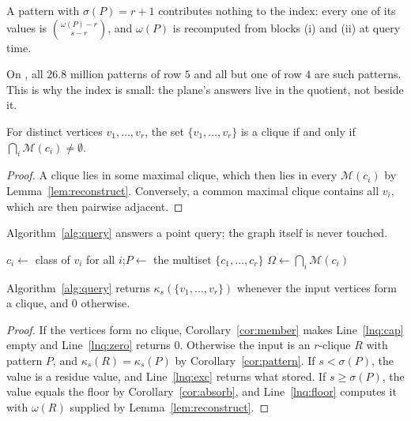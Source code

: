 \begin{corollary}\label{cor:zerobyte}
A pattern with $\sigma(P)=r+1$ contributes nothing to the index: every one of its values is $\binom{\omega(P)-r}{s-r}$, and $\omega(P)$ is recomputed from blocks (i) and (ii) at query time.
\end{corollary}

On \pkustk, all $26.8$ million patterns of row $5$ and all but one of row $4$ are such patterns.
%
This is why the index is small: the plane's answers live in the quotient, not beside it.

\begin{corollary}\label{cor:member}
For distinct vertices $v_1,\dots,v_r$, the set $\{v_1,\dots,v_r\}$ is a clique if and only if $\bigcap_i\mathcal{M}(c_i)\neq\emptyset$.
\end{corollary}

\begin{proof}
A clique lies in some maximal clique, which then lies in every $\mathcal{M}(c_i)$ by Lemma~\ref{lem:reconstruct}.
%
Conversely, a common maximal clique contains all $v_i$, which are then pairwise adjacent.
\end{proof}

Algorithm~\ref{alg:query} answers a point query; the graph itself is never touched.

\begin{algorithm}[t]
\caption{\queryalg: answer $\kappa_s$ for given vertices.}
\label{alg:query}
\algfontsize
{}
$c_i \leftarrow$ class of $v_i$ for all $i$;\quad $P \leftarrow$ the multiset $\{c_1,\dots,c_r\}$\label{lnq:cls}\;
$\Omega \leftarrow \bigcap_{i}\mathcal{M}(c_i)$\label{lnq:cap}\;
\label{lnq:floor}\;
\end{algorithm}

\begin{theorem}\label{thm:query}
Algorithm~\ref{alg:query} returns $\kappa_s(\{v_1,\dots,v_r\})$ whenever the input vertices form a clique, and $0$ otherwise.
\end{theorem}

\begin{proof}
If the vertices form no clique, Corollary~\ref{cor:member} makes Line~\ref{lnq:cap} empty and Line~\ref{lnq:zero} returns $0$.
%
Otherwise the input is an $r$-clique $R$ with pattern $P$, and $\kappa_s(R)=\kappa_s(P)$ by Corollary~\ref{cor:pattern}.
%
If $s<\sigma(P)$, the value is a residue value, and Line~\ref{lnq:exc} returns what \buildalg{} stored.
%
If $s\ge\sigma(P)$, the value equals the floor by Corollary~\ref{cor:absorb}, and Line~\ref{lnq:floor} computes it with $\omega(R)$ supplied by Lemma~\ref{lem:reconstruct}.
\end{proof}

